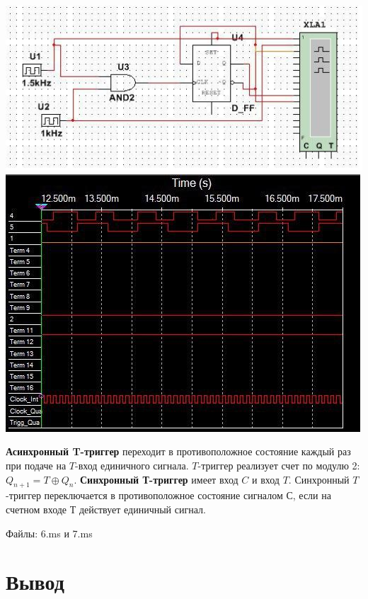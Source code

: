 \documentclass[a4paper,12pt]{article}
\begin{document}
\begin{center}
\includegraphics[scale=1]{../screens/7.jpg} \newline\newline
 \includegraphics[scale=1]{../screens/7_1.jpg} \newline\newline
 
\end{center}
 
\noindent \textbf{Асинхронный T-триггер} переходит в противоположное состояние каждый раз при подаче на $T$-вход единичного сигнала. $T$-триггер реализует счет по модулю 2: $Q_{n + 1} = T \oplus Q_{n}$. \textbf{Синхронный Т-триггер} имеет вход $C$ и вход $T$. Синхронный $T$-триггер переключается в противоположное состояние сигналом С, если на счетном входе Т действует единичный сигнал.\newline

\noindent Файлы: 6.ms и 7.ms

\clearpage
\section{Вывод}
\end{document}
